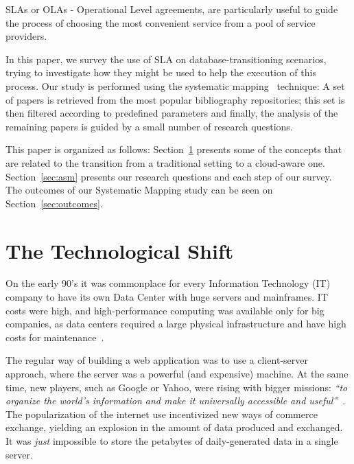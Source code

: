 \documentclass{article}
\begin{document}
SLAs or OLAs - Operational Level agreements, are particularly useful to guide the process of choosing the most convenient service from a pool of service providers.

In this paper, we survey the use of SLA on database-transitioning scenarios, trying to investigate how they might be used to help the execution of this process.
Our study is performed using the systematic mapping~\cite{Petersen:2008:SMS:2227115.2227123} technique: A set of papers is retrieved from the most popular bibliography repositories; this set is then filtered according to predefined parameters and finally, the analysis of the remaining papers is guided by a small number of research questions.

\bigskip

This paper is organized as follows: 
Section~\ref{sec:tts} presents some of the concepts that are related to the transition from a traditional setting to a cloud-aware one.
Section~\ref{sec:asm} presents our research questions and each step of our survey. The outcomes of our Systematic Mapping study can be seen on Section~\ref{sec:outcomes}.

\section{The Technological Shift}
\label{sec:tts}


On the early 90's it was commonplace for every Information Technology (IT) company to have its own Data Center with huge servers and mainframes. 
IT costs were high, and high-performance computing was available only for big companies, as data centers required a large physical infrastructure and have high costs for maintenance~\cite{Armbrust09m.:above}.

The regular way of building a web application was to use a client-server approach, where the server was a powerful (and expensive) machine. 
At the same time, new players, such as Google or Yahoo, were rising with bigger missions: \textit{``to organize the world's information and make it universally accessible and useful''}~\cite{Spector:2012:GHA:2209249.2209262}. 
The popularization of the internet use incentivized new ways of commerce exchange, yielding an explosion in the amount of data produced and exchanged. 
It was \textit{just} impossible to store the petabytes of daily-generated data in a single server. 
\end{document}
